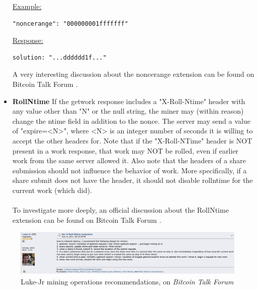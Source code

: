 \begin{itemize}
\underline{Example:} 
\begin{verbatim}
"noncerange": "000000001fffffff"
\end{verbatim}
\underline{Response:} 
\begin{verbatim}
solution: "...dddddd1f..."
\end{verbatim}
A very interesting discussion about the noncerange extension can be found on Bitcoin Talk Forum \cite{bitcointalkMiningProtocol}.

\item 
\textbf{RollNtime}
If the getwork response includes a "X-Roll-Ntime" header with any value other than "N" or the null string, the miner may (within reason) change the ntime field in addition to the nonce. The server may send a value of "expire=<N>", where <N> is an integer number of seconds it is willing to accept the other headers for. Note that if the "X-Roll-NTime" header is NOT present in a work response, that work may NOT be rolled, even if earlier work from the same server allowed it. Also note that the headers of a share submission should not influence the behavior of work. More specifically, if a share submit does not have the header, it should not disable rollntime for the current work (which did).\\\\
To investigate more deeply, an official discussion about the RollNtime extension can be found on Bitcoin Talk Forum \cite{bitcointalkXRollNtimeExtension}.
\end{itemize}

\begin{figure}[h!]
\includegraphics[width=1\textwidth, right]{Figures/getwork/getwork6.png}
\caption{Luke-Jr mining operations recommendations, on \textit{Bitcoin Talk Forum}}
\label{fig:getwork6}
\end{figure}

